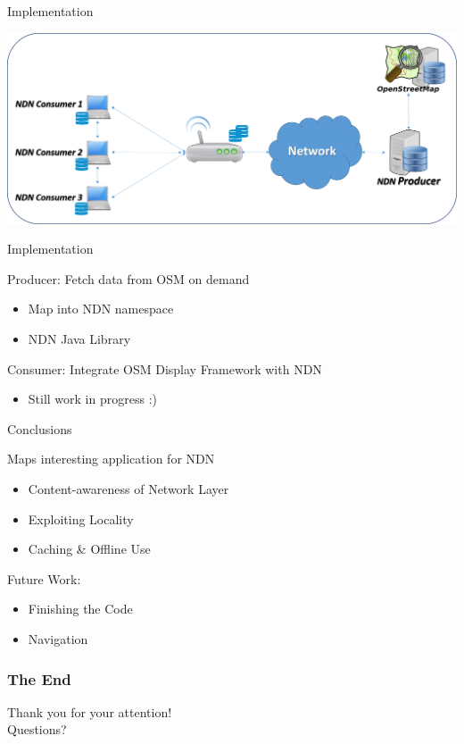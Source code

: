 \begin{frame}{Implementation}
\begin{center}
\includegraphics[width=\linewidth]{images/topo2.png}
\end{center}
\end{frame}



\begin{frame}{Implementation}
	
Producer: Fetch data from OSM on demand
\begin{itemize}
\item Map into NDN namespace
\item NDN Java Library
\end{itemize}
\pause

Consumer: Integrate OSM Display Framework with NDN
\begin{itemize}
\item Still work in progress :) 
\end{itemize}

\end{frame}


\begin{frame}{Conclusions}
	
Maps interesting application for NDN
\begin{itemize}
\item Content-awareness of Network Layer
\item Exploiting Locality 
\item Caching \& Offline Use
\end{itemize}

\pause
Future Work:
\begin{itemize}
\item Finishing the Code
\item Navigation
\end{itemize}
	

\end{frame}


\begin{frame}
	\frametitle{The End}
	{\LARGE Thank you for
		your attention!\\
		\vspace*{2em}
		Questions?
	}
\end{frame}




